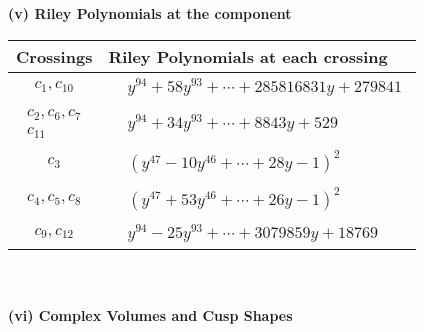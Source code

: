 \documentclass[1p]{elsarticle_modified}
\theoremstyle{definition}
\begin{document}
\newpage\renewcommand{\arraystretch}{1}
\flushleft \textbf{(v) Riley Polynomials at the component}\newline \\
\begin{tabular}{m{50pt}|m{274pt}}
Crossings & \hspace{64pt}Riley Polynomials at each crossing \\
\hline $$\begin{aligned}c_{1},c_{10}\end{aligned}$$&$\begin{aligned}
&y^{94}+58 y^{93}+\cdots+285816831 y+279841
\end{aligned}$\\
\hline $$\begin{aligned}c_{2},c_{6},c_{7}\\c_{11}\end{aligned}$$&$\begin{aligned}
&y^{94}+34 y^{93}+\cdots+8843 y+529
\end{aligned}$\\
\hline $$\begin{aligned}c_{3}\end{aligned}$$&$\begin{aligned}
&(y^{47}-10 y^{46}+\cdots+28 y-1)^{2}
\end{aligned}$\\
\hline $$\begin{aligned}c_{4},c_{5},c_{8}\end{aligned}$$&$\begin{aligned}
&(y^{47}+53 y^{46}+\cdots+26 y-1)^{2}
\end{aligned}$\\
\hline $$\begin{aligned}c_{9},c_{12}\end{aligned}$$&$\begin{aligned}
&y^{94}-25 y^{93}+\cdots+3079859 y+18769
\end{aligned}$\\
\hline
\end{tabular}\\~\\
\newpage\flushleft \textbf{(vi) Complex Volumes and Cusp Shapes}
\end{document}
